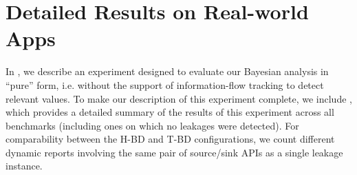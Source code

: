 \section{Detailed Results on Real-world Apps}\label{Se:completeRes}

In , we describe an experiment designed to evaluate our Bayesian analysis in ``pure'' form, i.e. without the support of information-flow tracking to detect relevant values. To make our description of this experiment complete, we include , which provides a detailed summary of the results of this experiment across all benchmarks (including ones on which no leakages were detected).
%
For comparability between the H-BD and T-BD configurations, we count different dynamic reports involving the same pair of source/sink APIs as a single leakage instance.

